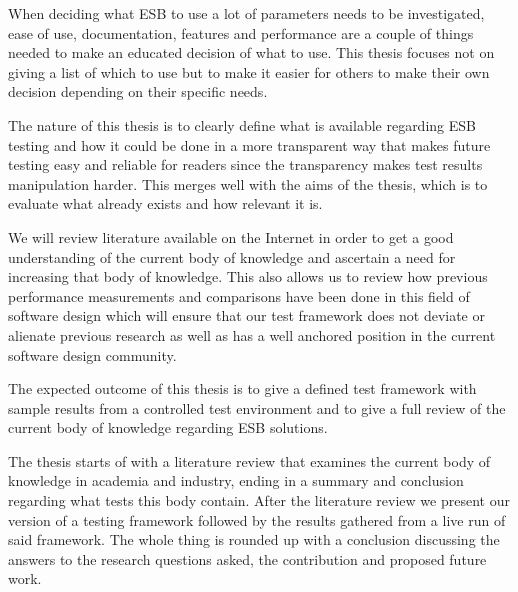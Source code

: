 When deciding what ESB to use a lot of parameters needs to be investigated, ease of use, documentation, features and performance are a couple of things needed to make an educated decision of what to use. 
This thesis focuses not on giving a list of which to use but to make it easier for others to make their own decision depending on their specific needs.

The nature of this thesis is to clearly define what is available regarding ESB testing and how it could be done in a more transparent way that makes future testing easy and reliable for readers since the transparency makes test results manipulation harder. 
This merges well with the aims of the thesis, which is to evaluate what already exists and how relevant it is.

We will review literature available on the Internet in order to get a good understanding of the current body of knowledge and ascertain a need for increasing that body of knowledge. 
This also allows us to review how previous performance measurements and comparisons have been done in this field of software design which will ensure that our test framework does not deviate or alienate previous research as well as has a well anchored position in the current software design community.

The expected outcome of this thesis is to give a defined test framework with sample results from a controlled test environment and to give a full review of the current body of knowledge regarding ESB solutions.

The thesis starts of with a literature review that examines the current body of knowledge in academia and industry, ending in a summary and conclusion regarding what tests this body contain.
After the literature review we present our version of a testing framework followed by the results gathered from a live run of said framework.
The whole thing is rounded up with a conclusion discussing the answers to the research questions asked, the contribution and proposed future work.

